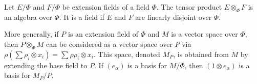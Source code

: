 Let $E/\Phi$ and $F/\Phi$ be extension fields of a field $\Phi$. The tensor product $E \otimes_\Phi F$ is an algebra over $\Phi$. It is a field if $E$ and $F$ are linearly disjoint over $\Phi$.

More generally, if $P$ is an extension field of $\Phi$ and $M$ is a vector space over $\Phi$, then $P \otimes_\Phi M$ can be considered as a vector space over $P$ via $\rho(\sum \rho_i \otimes x_i) = \sum \rho\rho_i \otimes x_i$. This space, denoted $M_P$, is obtained from $M$ by extending the base field to $P$. If $(e_\alpha)$ is a basis for $M/\Phi$, then $(1 \otimes e_\alpha)$ is a basis for $M_P/P$.
